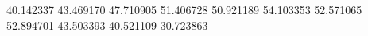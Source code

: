 40.142337
43.469170
47.710905
51.406728
50.921189
54.103353
52.571065
52.894701
43.503393
40.521109
30.723863

